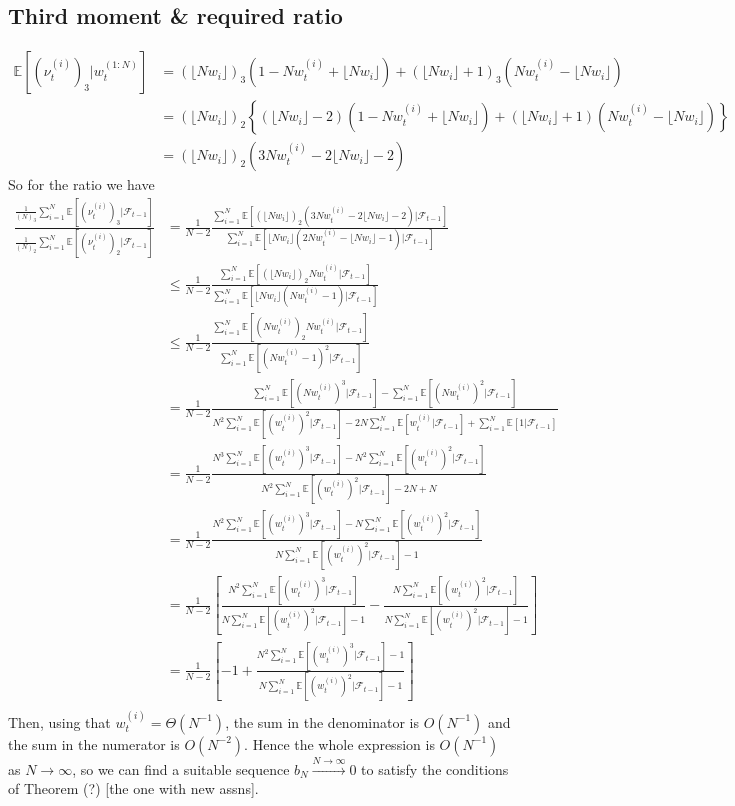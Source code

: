 \documentclass[fleqn]{article}
\theoremstyle{definition}
\newcommand{\E}{\mathbb{E}}
\newcommand{\Ntoinfty}{\overset{N\to\infty}{\longrightarrow}}
\newcommand{\F}{\mathcal{F}_{t-1}}
\newcommand{\vt}[2][t]{\nu_{#1}^{(#2)}}
\newcommand{\wt}[2][t]{w_{#1}^{(#2)}}
\newcommand{\flnw}{\lfloor Nw_i \rfloor }
\begin{document}
\subsection{Third moment \& required ratio}
\begin{align*}
\E[(\vt{i})_3 |\wt{1:N}] 
&= (\flnw)_3(1-N\wt{i} + \flnw) + (\flnw +1)_3(N\wt{i} - \flnw) \\
&= (\flnw)_2 \left\{ (\flnw -2)(1-N\wt{i} + \flnw) + (\flnw +1)(N\wt{i} - \flnw)\right\} \\
&= (\flnw)_2 \left( 3N\wt{i} - 2\flnw -2 \right)
\end{align*}
So for the ratio we have
\begin{align*}
\frac{\frac{1}{(N)_3}\sum_{i=1}^N \E[(\vt{i})_3 |\F]}{\frac{1}{(N)_2} \sum_{i=1}^N \E[(\vt{i})_2 |\F]}  
&= \frac{1}{N-2} \frac{\sum_{i=1}^N \E[(\flnw)_2(3N\wt{i} - 2\flnw -2) |\F]}{ \sum_{i=1}^N \E[\flnw(2N\wt{i} - \flnw -1) |\F]} \\
&\leq \frac{1}{N-2} \frac{\sum_{i=1}^N \E[(\flnw)_2N\wt{i} |\F]}{ \sum_{i=1}^N \E[\flnw(N\wt{i} -1) |\F]} \\
&\leq \frac{1}{N-2} \frac{\sum_{i=1}^N \E[(N\wt{i})_2 N\wt{i} |\F]}{ \sum_{i=1}^N \E[(N\wt{i} -1)^2 |\F]} \\
&= \frac{1}{N-2} \frac{\sum_{i=1}^N \E[(N\wt{i})^3 |\F] - \sum_{i=1}^N \E[(N\wt{i})^2 |\F]}{ N^2 \sum_{i=1}^N \E[(\wt{i})^2 |\F] - 2N \sum_{i=1}^N \E[\wt{i} |\F] + \sum_{i=1}^N \E[1 |\F]} \\
&= \frac{1}{N-2} \frac{N^3 \sum_{i=1}^N \E[(\wt{i})^3 |\F] - N^2 \sum_{i=1}^N \E[(\wt{i})^2 |\F]}{ N^2 \sum_{i=1}^N \E[(\wt{i})^2 |\F] - 2N  + N} \\
&= \frac{1}{N-2} \frac{N^2 \sum_{i=1}^N \E[(\wt{i})^3 |\F] - N \sum_{i=1}^N \E[(\wt{i})^2 |\F]}{ N \sum_{i=1}^N \E[(\wt{i})^2 |\F] - 1} \\
&= \frac{1}{N-2} \left[ \frac{N^2 \sum_{i=1}^N \E[(\wt{i})^3 |\F]}{ N \sum_{i=1}^N \E[(\wt{i})^2 |\F] - 1} - \frac{N \sum_{i=1}^N \E[(\wt{i})^2 |\F]}{ N \sum_{i=1}^N \E[(\wt{i})^2 |\F] - 1} \right] \\
&= \frac{1}{N-2} \left[-1 + \frac{N^2 \sum_{i=1}^N \E[(\wt{i})^3 |\F] -1}{ N \sum_{i=1}^N \E[(\wt{i})^2 |\F] - 1} \right] \\
\end{align*}
Then, using that $\wt{i} =\Theta (N^{-1})$, the sum in the denominator is $O(N^{-1})$ and the sum in the numerator is $O(N^{-2})$. Hence the whole expression is $O(N^{-1})$ as $N\to\infty$, so we can find a suitable sequence $b_N \Ntoinfty 0$ to satisfy the conditions of Theorem (?) [the one with new assns].


\end{document}
